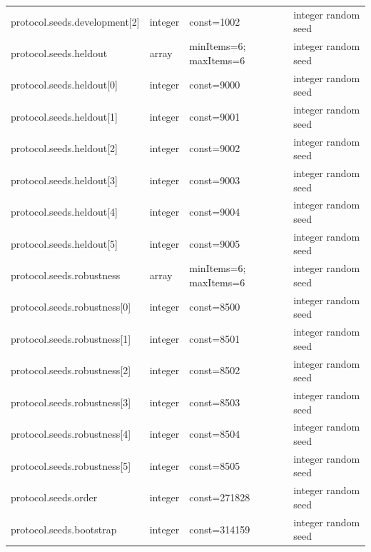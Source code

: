 \begin{longtable}{@{}>{\raggedright\arraybackslash}p{}>{\raggedright\arraybackslash}p{}>{\raggedright\arraybackslash}p{}>{\raggedright\arraybackslash}p{}@{}}
protocol.\allowbreak{}seeds.\allowbreak{}development[2] & integer & const=\allowbreak{}1002 & integer random seed\\
protocol.\allowbreak{}seeds.\allowbreak{}heldout & array & minItems=\allowbreak{}6; maxItems=\allowbreak{}6 & integer random seed\\
protocol.\allowbreak{}seeds.\allowbreak{}heldout[0] & integer & const=\allowbreak{}9000 & integer random seed\\
protocol.\allowbreak{}seeds.\allowbreak{}heldout[1] & integer & const=\allowbreak{}9001 & integer random seed\\
protocol.\allowbreak{}seeds.\allowbreak{}heldout[2] & integer & const=\allowbreak{}9002 & integer random seed\\
protocol.\allowbreak{}seeds.\allowbreak{}heldout[3] & integer & const=\allowbreak{}9003 & integer random seed\\
protocol.\allowbreak{}seeds.\allowbreak{}heldout[4] & integer & const=\allowbreak{}9004 & integer random seed\\
protocol.\allowbreak{}seeds.\allowbreak{}heldout[5] & integer & const=\allowbreak{}9005 & integer random seed\\
protocol.\allowbreak{}seeds.\allowbreak{}robustness & array & minItems=\allowbreak{}6; maxItems=\allowbreak{}6 & integer random seed\\
protocol.\allowbreak{}seeds.\allowbreak{}robustness[0] & integer & const=\allowbreak{}8500 & integer random seed\\
protocol.\allowbreak{}seeds.\allowbreak{}robustness[1] & integer & const=\allowbreak{}8501 & integer random seed\\
protocol.\allowbreak{}seeds.\allowbreak{}robustness[2] & integer & const=\allowbreak{}8502 & integer random seed\\
protocol.\allowbreak{}seeds.\allowbreak{}robustness[3] & integer & const=\allowbreak{}8503 & integer random seed\\
protocol.\allowbreak{}seeds.\allowbreak{}robustness[4] & integer & const=\allowbreak{}8504 & integer random seed\\
protocol.\allowbreak{}seeds.\allowbreak{}robustness[5] & integer & const=\allowbreak{}8505 & integer random seed\\
protocol.\allowbreak{}seeds.\allowbreak{}order & integer & const=\allowbreak{}271828 & integer random seed\\
protocol.\allowbreak{}seeds.\allowbreak{}bootstrap & integer & const=\allowbreak{}314159 & integer random seed\\

\end{longtable}
